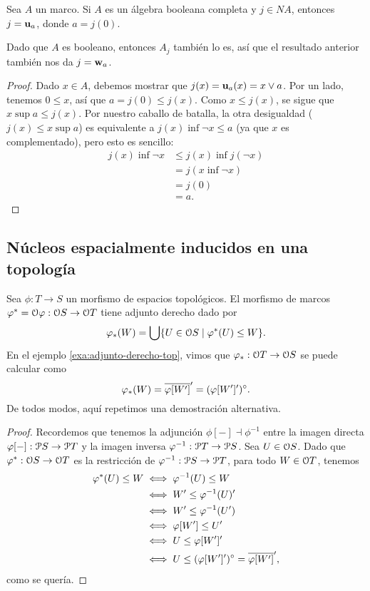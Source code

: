 \begin{theorem}
  Sea $A$ un marco.
  Si $A$ es un álgebra booleana completa y $j\in NA$,
  entonces $j=\unuc a$, donde $a=j(0)$.
  
  Dado que $A$ es booleano, entonces $A_j$ también lo es,
  así que el resultado anterior también nos da $j=\wnuc a$.
\end{theorem}
\begin{proof}
    Dado $x\in A$, debemos mostrar que $j(x)=\unuc a(x)=x\sup a$.
    Por un lado, tenemos $0\leq x$, así que $a=j(0)\leq j(x)$.
    Como $x\leq j(x)$, se sigue que $x\sup a\leq j(x)$.
    Por nuestro caballo de batalla, la otra desigualdad
    ($j(x)\leq x\sup a$) es equivalente a $j(x)\inf \neg x\leq a$
    (ya que $x$ es complementado), pero esto es sencillo:
    \begin{align*}
        j(x)\inf\neg x
        &\leq j(x)\inf j(\neg x) \\
        &= j(x\inf\neg x) \\
        &= j(0) \\
        &= a.
    \end{align*}
\end{proof}

\subsection{Núcleos espacialmente inducidos en una topología}

Sea $\phi:T\to S$ un morfismo de espacios topológicos.
El morfismo de marcos $\phi^*=\cal O\phi:\cal OS\to\cal OT$
tiene adjunto derecho dado por
\[
  \phi_*(W)
  = \bigcup\{U\in\cal OS \mid \phi^*(U) \leq W\}
.\]
En el ejemplo \ref{exa:adjunto-derecho-top}, vimos que
$\phi_*:\cal OT\to\cal OS$ se puede calcular como
\[
  \phi_*(W) = \ol{\phi[W']}' = (\phi[W']')^\circ
.\]
De todos modos, aquí repetimos una demostración alternativa.
\begin{proof}
  Recordemos que tenemos la adjunción $\phi[-]\dashv\phi^{-1}$
  entre la imagen directa $\phi[-]:\cal PS\to\cal PT$ y la imagen
  inversa $\phi^{-1}:\cal PT\to\cal PS$.
  Sea $U\in\cal OS$.
  Dado que $\phi^*:\cal OS\to\cal OT$ es la restricción de
  $\phi^{-1}:\cal PS\to\cal PT$, para todo $W\in\cal OT$, tenemos
  \begin{align*}
      \phi^*(U)\leq W
      &\iff \phi^{-1}(U)\leq W \\
      &\iff W'\leq \phi^{-1}(U)' \\
      &\iff W'\leq \phi^{-1}(U') \\
      &\iff \phi[W'] \leq U' \\
      &\iff U\leq \phi[W']' \\
      &\iff U\leq (\phi[W']')^\circ = \ol{\phi[W']}',
  \end{align*}
  como se quería.
\end{proof}

